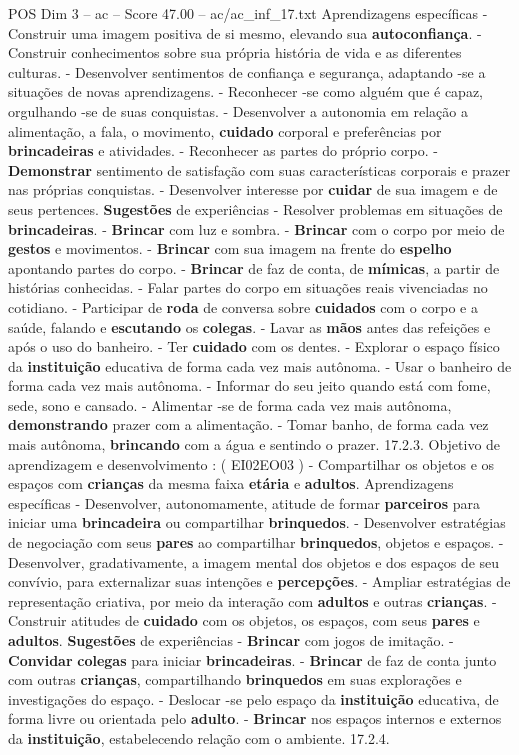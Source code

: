 \begin{textsample}{POS Dim 3 – ac – Score 47.00 – ac/ac\_inf\_17.txt}
Aprendizagens específicas - Construir uma imagem positiva de si mesmo, elevando sua \textbf{autoconfiança}. - Construir conhecimentos sobre sua própria história de vida e as diferentes culturas. - Desenvolver sentimentos de confiança e segurança, adaptando -se a situações de novas aprendizagens. - Reconhecer -se como alguém que é capaz, orgulhando -se de suas conquistas. - Desenvolver a autonomia em relação a alimentação, a fala, o movimento, \textbf{cuidado} corporal e preferências por \textbf{brincadeiras} e atividades. - Reconhecer as partes do próprio corpo. - \textbf{Demonstrar} sentimento de satisfação com suas características corporais e prazer nas próprias conquistas. - Desenvolver interesse por \textbf{cuidar} de sua imagem e de seus pertences. \textbf{Sugestões} de experiências - Resolver problemas em situações de \textbf{brincadeiras}. - \textbf{Brincar} com luz e sombra. - \textbf{Brincar} com o corpo por meio de \textbf{gestos} e movimentos. - \textbf{Brincar} com sua imagem na frente do \textbf{espelho} apontando partes do corpo. - \textbf{Brincar} de faz de conta, de \textbf{mímicas}, a partir de histórias conhecidas. - Falar partes do corpo em situações reais vivenciadas no cotidiano. - Participar de \textbf{roda} de conversa sobre \textbf{cuidados} com o corpo e a saúde, falando e \textbf{escutando} os \textbf{colegas}. - Lavar as \textbf{mãos} antes das refeições e após o uso do banheiro. - Ter \textbf{cuidado} com os dentes. - Explorar o espaço físico da \textbf{instituição} educativa de forma cada vez mais autônoma. - Usar o banheiro de forma cada vez mais autônoma. - Informar do seu jeito quando está com fome, sede, sono e cansado. - Alimentar -se de forma cada vez mais autônoma, \textbf{demonstrando} prazer com a alimentação. - Tomar banho, de forma cada vez mais autônoma, \textbf{brincando} com a água e sentindo o prazer. 17.2.3.
Objetivo de aprendizagem e desenvolvimento : ( EI02EO03 ) - Compartilhar os objetos e os espaços com \textbf{crianças} da mesma faixa \textbf{etária} e \textbf{adultos}.
Aprendizagens específicas - Desenvolver, autonomamente, atitude de formar \textbf{parceiros} para iniciar uma \textbf{brincadeira} ou compartilhar \textbf{brinquedos}. - Desenvolver estratégias de negociação com seus \textbf{pares} ao compartilhar \textbf{brinquedos}, objetos e espaços. - Desenvolver, gradativamente, a imagem mental dos objetos e dos espaços de seu convívio, para externalizar suas intenções e \textbf{percepções}. - Ampliar estratégias de representação criativa, por meio da interação com \textbf{adultos} e outras \textbf{crianças}. - Construir atitudes de \textbf{cuidado} com os objetos, os espaços, com seus \textbf{pares} e \textbf{adultos}. \textbf{Sugestões} de experiências - \textbf{Brincar} com jogos de imitação. - \textbf{Convidar} \textbf{colegas} para iniciar \textbf{brincadeiras}. - \textbf{Brincar} de faz de conta junto com outras \textbf{crianças}, compartilhando \textbf{brinquedos} em suas explorações e investigações do espaço. - Deslocar -se pelo espaço da \textbf{instituição} educativa, de forma livre ou orientada pelo \textbf{adulto}. - \textbf{Brincar} nos espaços internos e externos da \textbf{instituição}, estabelecendo relação com o ambiente. 17.2.4.

\end{textsample}
